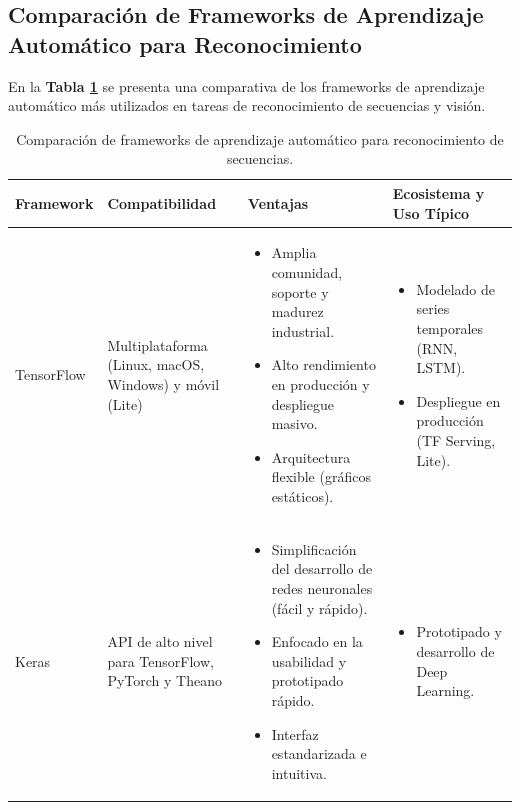 \subsection{Comparación de Frameworks de Aprendizaje Automático para Reconocimiento}

En la \textbf{Tabla \ref{tabla_comparativa_frameworks}} se presenta una comparativa de los frameworks de aprendizaje automático más utilizados en tareas de reconocimiento de secuencias y visión.

\begin{table}[H]
    \centering
    \caption{Comparación de frameworks de aprendizaje automático para reconocimiento de secuencias.}
    \label{tabla_comparativa_frameworks}
    \begin{tabular}{|p{1.8cm}|p{2.5cm}|p{6.5cm}|p{5cm}|} %
        \hline
        \textbf{Framework} & \textbf{Compatibilidad} & \textbf{Ventajas} & \textbf{Ecosistema y Uso Típico} \\
        \hline
        TensorFlow &
        Multiplataforma (Linux, macOS, Windows) y móvil (Lite) &
        \begin{itemize}
            \item Amplia comunidad, soporte y madurez industrial.
            \item Alto rendimiento en producción y despliegue masivo.
            \item Arquitectura flexible (gráficos estáticos).
        \end{itemize} &
        \begin{itemize}
            \item Modelado de series temporales (RNN, LSTM).
            \item Despliegue en producción (TF Serving, Lite).
        \end{itemize} \\
        \hline
        Keras &
        API de alto nivel para TensorFlow, PyTorch y Theano &
        \begin{itemize}
            \item Simplificación del desarrollo de redes neuronales (fácil y rápido).
            \item Enfocado en la usabilidad y prototipado rápido.
            \item Interfaz estandarizada e intuitiva.
        \end{itemize} &
        \begin{itemize}
            \item Prototipado y desarrollo de Deep Learning.

\end{itemize}
\end{tabular}
\end{table}
